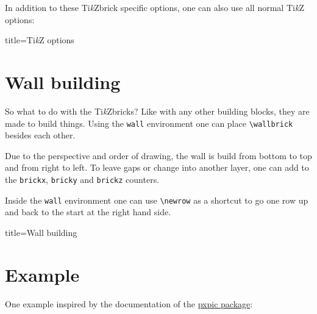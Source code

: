 \documentclass[parskip=half]{scrartcl}
\newcommand{\tikzbrick}{Ti\emph{k}Zbrick\xspace}
\begin{document}
In addition to these \tikzbrick specific options, one can also use all normal Ti\emph{k}Z options:
\begin{tcblisting}{title={Ti\emph{k}Z options}}
\end{tcblisting}

\section{Wall building}

So what to do with the \tikzbrick{}s? Like with any other building blocks, they are made to build things. Using the \lstinline|wall| environment one can place \lstinline|\wallbrick| besides each other. 

Due to the perspective and order of drawing, the wall is build from bottom to top and from right to left. To leave gaps or change into another layer, one can add to the \lstinline|brickx|, \lstinline|bricky| and \lstinline|brickz| counters. 

Inside the \lstinline|wall| environment one can use \lstinline|\newrow| as a shortcut to go one row up and back to the start at the right hand side. 
\begin{tcblisting}{title={Wall building}}
\begin{wall}
  \addtocounter{brickx}{1}
  \newrow
\end{wall}
\end{tcblisting}

\newpage
\section{Example}

One example inspired by the documentation of the  \href{https://www.ctan.org/pkg/pxpic}{pxpic package}:
\end{document}
